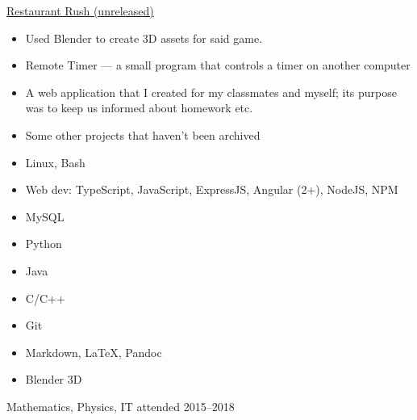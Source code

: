 \documentclass[10pt,a4paper,ragged2e,withhyper]{altacv}
\begin{document}
\begin{paracol}{2}
\small\href{https://github.com/Qarian/Restaurant-rush}{Restaurant Rush (unreleased)}
\smallskip

\begin{itemize}
    \item Used Blender to create 3D assets for said game.
\end{itemize}

\divider

\begin{itemize}
    \item Remote Timer — a small program that controls a timer on another computer
    \item A web application that I created for my classmates and myself; its purpose was to keep us informed about homework etc.
    \item Some other projects that haven’t been archived
\end{itemize}

\divider
\switchcolumn


{
    \bfseries
    \begin{itemize}
        \item Linux, Bash
        \item Web dev: TypeScript, JavaScript, ExpressJS, Angular (2+), NodeJS, NPM
        \item MySQL
        \item Python
        \item Java
        \item C/C++
        \item Git
        \item Markdown, LaTeX, Pandoc
        \item Blender 3D
    \end{itemize}
}



\divider

{Mathematics, Physics, IT\newline\smallskip
attended 2015–2018}


\end{paracol}
\end{document}
